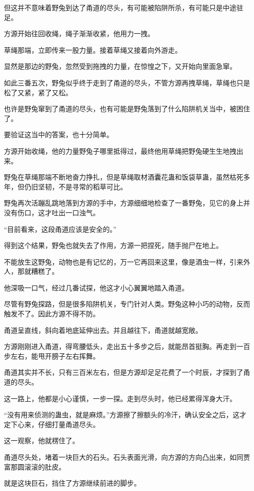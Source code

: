 \begin{this_body}
但这并不意味着野兔到达了甬道的尽头，有可能被陷阱所杀，有可能只是中途驻足。

方源开始往回收绳，绳子渐渐收紧，他用力一拽。

草绳那端，立即传来一股力量。接着草绳又接着向外游走。

显然是那边的野兔，忽然受到拖拽的力量，在惊惶之下，又开始向里面急窜。

如此三番五次，野兔似乎终于走到了甬道的尽头，不管方源再拽草绳，草绳也只是松了又紧，紧了又松。

也许是野兔窜到了甬道的尽头，也有可能是野兔落到了什么陷阱机关当中，被困住了。

要验证这当中的答案，也十分简单。

方源开始收绳，他的力量野兔子哪里抵得过，最终他用草绳把野兔硬生生地拽出来。

野兔在草绳那端不断地奋力挣扎，但是草绳取材酒囊花蛊和饭袋草蛊，虽然枯死多年，但仍旧坚韧，不是寻常的稻草可比。

野兔再次活蹦乱跳地落到方源的手中，方源细细地检查了一番野兔，见它的身上并没有伤口，这才吐出一口浊气。

“目前看来，这段甬道应该是安全的。”

得到这个结果，野兔也就失去了作用，方源一把捏死，随手抛尸在地上。

不能放生这野兔，动物也是有记忆的，万一它再回来这里，像是酒虫一样，引来外人，那就糟糕了。

他深吸一口气，经过几番试探，他这才小心翼翼地踏入甬道。

尽管有野兔探路，但是很多陷阱机关，专门针对人类。野兔这种小巧的动物，反而触发不了。因此方源不得不防。

甬道呈直线，斜向着地底延伸出去。并且越往下，甬道就越宽敞。

方源刚刚进入甬道，得弯腰低头，走出五十多步之后，就能昂首挺胸。再走到一百步左右，能甩开膀子左右挥舞。

甬道其实并不长，只有三百米左右，但是方源却足足花费了一个时辰，才探到了甬道的尽头。

这一路上，他都是小心谨慎，一步一探。走到尽头时，他已经累得浑身大汗。

“没有用来侦测的蛊虫，就是麻烦。”方源擦了擦额头的冷汗，确认安全之后，这才定下心来，仔细打量甬道尽头。

这一观察，他就楞住了。

甬道尽头处，堵着一块巨大的石头。石头表面光滑，向方源的方向凸出来，如同贾富那圆滚滚的肚皮。

就是这块巨石，挡住了方源继续前进的脚步。


\end{this_body}

